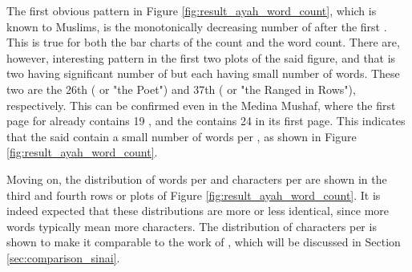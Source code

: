 The first obvious pattern in Figure \ref{fig:result_ayah_word_count}, which is known to Muslims, is the monotonically decreasing number of   after the first  . This is true for both the bar charts of the   count and the word count. There are, however, interesting pattern in the first two plots of the said figure, and that is two   having significant number of   but each having small number of words. These two   are the 26th   (  or "the Poet") and 37th   (  or "the Ranged in Rows"), respectively. This can be confirmed even in the Medina Mushaf, where the first page for   already contains 19  , and the   contains 24   in its first page. This indicates that the said   contain a small number of words per  , as shown in Figure \ref{fig:result_ayah_word_count}.

Moving on, the distribution of words per   and characters per   are shown in the third and fourth rows or plots of Figure \ref{fig:result_ayah_word_count}. It is indeed expected that these distributions are more or less identical, since more words typically mean more characters. The distribution of characters per   is shown to make it comparable to the work of , which will be discussed in Section \ref{sec:comparison_sinai}.

